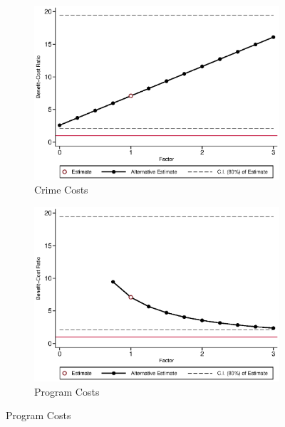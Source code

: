 \begin{figure}[H]
\ContinuedFloat		
	\begin{subfigure}[h]{0.8\textwidth}
	\centering
	\caption{Crime Costs} \label{fig:bcrf_crime_m1}
	\includegraphics[width=\textwidth]{AppOutput/Sensitivity/bcrf_crime_m1.eps}
	\end{subfigure}
	
	\begin{subfigure}[h]{0.8\textwidth}
	\centering
	\caption{Program Costs} \label{fig:bcrf_costs_m1}
	\includegraphics[width=\textwidth]{AppOutput/Sensitivity/bcrf_costs_m1.eps}
	\end{subfigure}
\end{figure}

